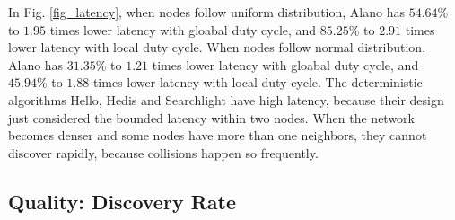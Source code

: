 In Fig. \ref{fig_latency}, when nodes follow uniform distribution, Alano has $54.64\%$ to $1.95$ times lower latency with gloabal duty cycle, and $85.25\%$ to $2.91$ times lower latency with local duty cycle. 
When nodes follow normal distribution, Alano has $31.35\%$ to $1.21$ times lower latency with gloabal duty cycle, and $45.94\%$ to $1.88$ times lower latency with local duty cycle. 
The deterministic algorithms Hello, Hedis and Searchlight have high latency, because their design just considered the bounded latency within two nodes. When the network becomes denser and some nodes have more than one neighbors, they cannot discover rapidly, because collisions happen so frequently.


\subsection{Quality: Discovery Rate}





